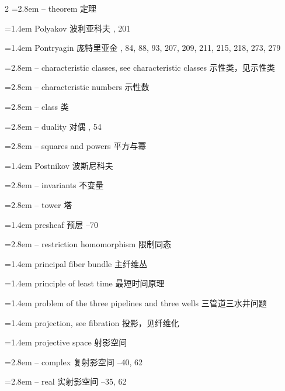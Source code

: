 \begin{multicols}{2}
\noindent\hangindent=2.8em -- theorem \quad 定理 \par
\noindent\hangindent=1.4em Polyakov \quad 波利亚科夫 , 201\par
\noindent\hangindent=1.4em Pontryagin \quad 庞特里亚金 , 84, 88, 93, 207, 209, 211, 215, 218, 273, 279\par
\noindent\hangindent=2.8em -- characteristic classes, see characteristic classes \quad 示性类，见示性类 \quad\par
\noindent\hangindent=2.8em -- characteristic numbers \quad 示性数 \par
\noindent\hangindent=2.8em -- class \quad 类 \par
\noindent\hangindent=2.8em -- duality \quad 对偶 , 54\par
\noindent\hangindent=2.8em -- squares and powers \quad 平方与幂 \par
\noindent\hangindent=1.4em Postnikov \quad 波斯尼科夫 \par
\noindent\hangindent=2.8em -- invariants \quad 不变量 \par
\noindent\hangindent=2.8em -- tower \quad 塔 \par
\noindent\hangindent=1.4em presheaf \quad 预层 --70\par
\noindent\hangindent=2.8em -- restriction homomorphism \quad 限制同态 \par
\noindent\hangindent=1.4em principal fiber bundle \quad 主纤维丛 \par
\noindent\hangindent=1.4em principle of least time \quad 最短时间原理 \par
\noindent\hangindent=1.4em problem of the three pipelines and three wells \quad 三管道三水井问题 \par
\noindent\hangindent=1.4em projection, see fibration \quad 投影，见纤维化 \quad\par
\noindent\hangindent=1.4em projective space \quad 射影空间 \quad\par
\noindent\hangindent=2.8em -- complex \quad 复射影空间 --40, 62\par
\noindent\hangindent=2.8em -- real \quad 实射影空间 --35, 62\par
\end{multicols}


